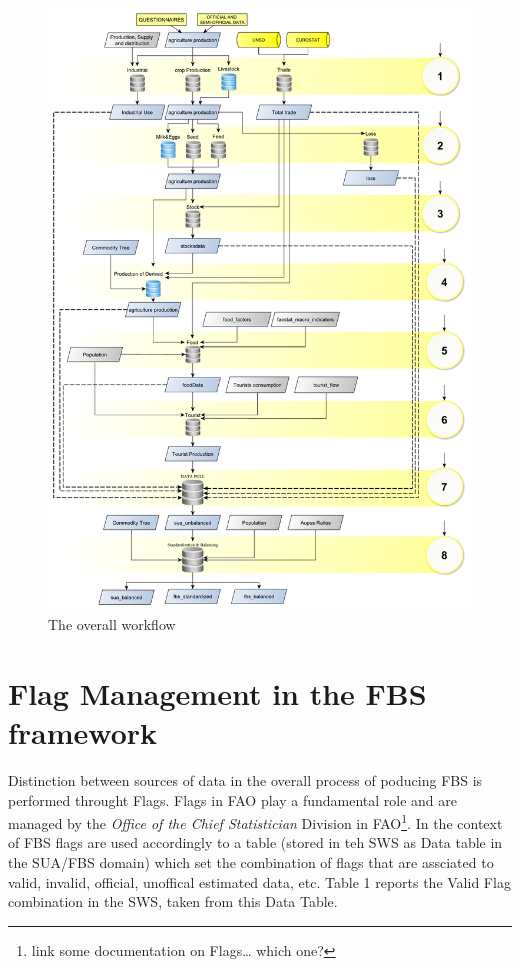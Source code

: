 \documentclass[]{article}
\let\rmarkdownfootnote\footnote%
\def\footnote{\protect\rmarkdownfootnote}
\begin{document}
\begin{figure}[H]

{\centering \includegraphics{images/SwsFbs/03_DataFlow_all} 

}

\caption{\label{fig:f3}The overall workflow}\label{fig:f3}
\end{figure}

\section*{Flag Management in the FBS
framework}\label{flag-management-in-the-fbs-framework}

Distinction between sources of data in the overall process of poducing
FBS is performed throught Flags. Flags in FAO play a fundamental role
and are managed by the \emph{Office of the Chief Statistician} Division
in FAO\footnote{link some documentation on Flags\ldots{} which one?}. In
the context of FBS flags are used accordingly to a table (stored in teh
SWS as Data table in the SUA/FBS domain) which set the combination of
flags that are assciated to valid, invalid, official, unoffical
estimated data, etc. Table 1 reports the Valid Flag combination in the
SWS, taken from this Data Table.
\end{document}

